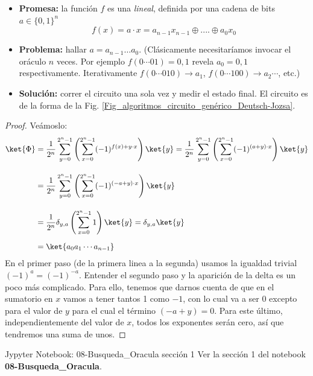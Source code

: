 \documentclass[a4paper,11pt]{book} %
\numberwithin{equation}{chapter}
\def\lp{\left(}
\def\rp{\right)}
\begin{document}
\begin{itemize}
	\item \textbf{Promesa:} la función $f$ es una \textit{lineal}, definida por una cadena de bits $a \in \{0,1\}^n$
		\begin{equation*}
		f(x) = a\cdot x  = a_{n-1} x_{n-1} \oplus ....\oplus a_0 x_0
		\end{equation*}

	
	\item \textbf{Problema:} hallar $a = a_{n-1} \ldots a_0$. (Clásicamente necesitaríamos invocar el oráculo  $n$ veces. Por ejemplo  $f(0\cdots 0 1)=0,1 $ revela $a_0=0,1$ respectivamente. Iterativamente  $f(0\cdots 0 1 0)\to a_1$, $ f(0\cdots 1 0 0)\to a_2 \cdots$, etc.)
	
	\item \textbf{Solución:} correr el circuito una sola vez y medir el estado final. 	El circuito es de la forma de la Fig. \ref{Fig_algoritmos_circuito_genérico_Deutsch-Jozsa}.
\end{itemize}

	\begin{proof}
	Veámoslo:
	\begin{align*}
	\ket{\Phi} & = \frac{1}{2^n}\sum_{y=0}^{2^n-1} \left(\sum_{x=0}^{2^n-1}(-1)^{f(x)+ y\cdot x}\right)\ket{y} = \frac{1}{2^n}\sum_{y=0}^{2^n-1} \left(\sum_{x=0}^{2^n-1}(-1)^{(a+y)\cdot x}\right)\ket{y} \\  \rule{0mm}{10mm}
	& =  \frac{1}{2^n}\sum_{y=0}^{2^n-1} \left(\sum_{x=0}^{2^n-1}(-1)^{(-a+y)\cdot x}\right)\ket{y} \\ \rule{0mm}{10mm}
	& =  \frac{1}{2^n} \delta_{y,a} \lp \sum_{x=0}^{2^n-1} 1 \rp \ket{y} = \delta_{y,a} \ket{y} \\  \rule{0mm}{5mm} 
    & =  \ket{a_0a_1\cdots a_{n-1}}
	\end{align*}
	En el primer paso (de la primera linea a la segunda) usamos la igualdad trivial $ (-1)^a = (-1)^{-a}$. Entender el segundo paso y la aparición de la  delta es un poco más complicado. Para ello, tenemos que darnos cuenta de que en el sumatorio en $x$ vamos a tener tantos 1 como $-1$, con lo cual va a ser $0$ excepto para el valor de $y$ para el cual el término $(-a+y) = 0$. Para este último, independientemente del valor de $x$, todos los exponentes serán cero, así que tendremos una suma de unos.
	\end{proof}

	\begin{mybox_orange}{Jypyter Notebook: 08-Busqueda\_Oracula sección 1}
	Ver la sección 1 del notebook \textbf{08-Busqueda\_Oracula}.
	\end{mybox_orange}
\end{document}
